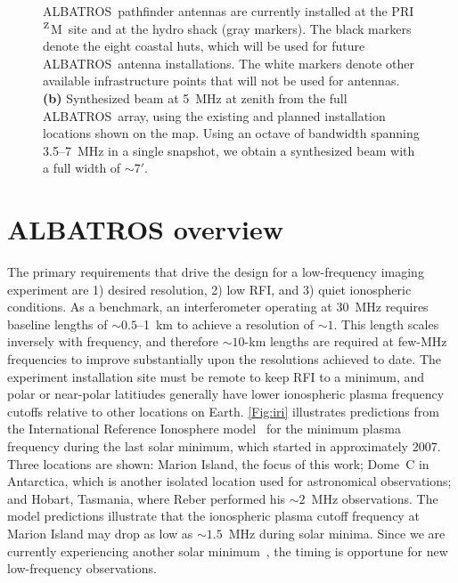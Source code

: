 \documentclass{ws-jai}
\def\albatros{ALBATROS}
\def\prizm{PRI$^{\rm Z}$M}
\begin{document}
\begin{figure}
{      \albatros\ pathfinder antennas are currently installed at the
      \prizm\ site and at the hydro shack (gray markers).  The black
      markers denote the eight coastal huts, which will be used for
      future \albatros\ antenna installations.  The white markers
      denote other available infrastructure points that will not be
      used for antennas.  {\bf (b)} Synthesized beam at 5~MHz at zenith from the
      full \albatros\ array, using the existing and planned
      installation locations shown on the map.  Using an octave of
      bandwidth spanning 3.5--7~MHz in a single snapshot, we obtain a synthesized beam with 
      a full width of $\sim7'$.}\label{Fig:marion_map_beam}
\end{figure}

\section{ALBATROS overview}

The primary requirements that drive the design for a low-frequency
imaging experiment are 1) desired resolution, 2) low RFI, and 3) quiet
ionospheric conditions.  As a benchmark, an interferometer operating
at 30~MHz requires baseline lengths of $\sim0.5$--1~km 
to achieve a resolution of $\sim 1$\degree.  This length scales
inversely with frequency, and therefore $\sim 10$-km lengths are
required at few-MHz frequencies to improve substantially upon the resolutions
achieved to date.  The experiment installation site must be remote to
keep RFI to a minimum, and polar or near-polar latitiudes generally
have lower ionospheric plasma frequency cutoffs relative to other
locations on Earth.  \autoref{Fig:iri} illustrates predictions from
the International Reference Ionosphere
model~\citep{2018AdRS...16....1B} for the minimum plasma frequency
during the last solar minimum, which started in approximately 2007.
Three locations are shown: Marion Island, the focus of this work;
Dome~C in Antarctica, which is another isolated location used for
astronomical observations; and Hobart, Tasmania, where Reber performed
his $\sim2$~MHz observations.  The model predictions illustrate that
the ionospheric plasma cutoff frequency at Marion Island may drop as
low as $\sim1.5$~MHz during solar minima.  Since we are currently
experiencing another solar minimum~\citep{2018NatCo...9.5209B}, the
timing is opportune for new low-frequency observations.
\end{document}
